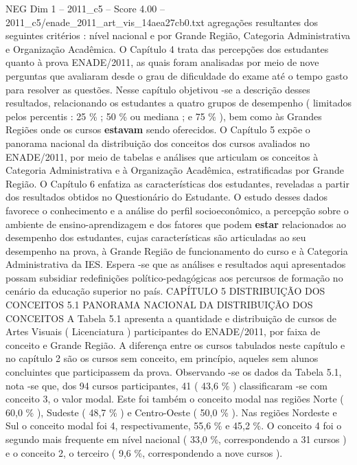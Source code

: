\begin{textsample}{NEG Dim 1 – 2011\_c5 – Score 4.00 – 2011\_c5/enade\_2011\_art\_vis\_14aea27cb0.txt}  \label{ex:f1_neg_312}
agregações resultantes dos seguintes critérios : nível nacional e por Grande Região, Categoria Administrativa e Organização Acadêmica.
O Capítulo 4 trata das percepções dos estudantes quanto à prova ENADE/2011, as quais foram analisadas por meio de nove perguntas que avaliaram desde o grau de dificuldade do exame até o tempo gasto para resolver as questões.
Nesse capítulo objetivou -se a descrição desses resultados, relacionando os estudantes a quatro grupos de desempenho ( limitados pelos percentis : 25 \% ; 50 \% ou mediana ; e 75 \% ), bem como às Grandes Regiões onde os cursos \textbf{estavam} sendo oferecidos.
O Capítulo 5 expõe o panorama nacional da distribuição dos conceitos dos cursos avaliados no ENADE/2011, por meio de tabelas e análises que articulam os conceitos à Categoria Administrativa e à Organização Acadêmica, estratificadas por Grande Região.
O Capítulo 6 enfatiza as características dos estudantes, reveladas a partir dos resultados obtidos no Questionário do Estudante.
O estudo desses dados favorece o conhecimento e a análise do perfil socioeconômico, a percepção sobre o ambiente de ensino-aprendizagem e dos fatores que podem \textbf{estar} relacionados ao desempenho dos estudantes, cujas características são articuladas ao seu desempenho na prova, à Grande Região de funcionamento do curso e à Categoria Administrativa da IES.
Espera -se que as análises e resultados aqui apresentados possam subsidiar redefinições político-pedagógicas aos percursos de formação no cenário da educação superior no país.
CAPÍTULO 5 DISTRIBUIÇÃO DOS CONCEITOS 5.1 PANORAMA NACIONAL DA DISTRIBUIÇÃO DOS CONCEITOS A Tabela 5.1 apresenta a quantidade e distribuição de cursos de Artes Visuais ( Licenciatura ) participantes do ENADE/2011, por faixa de conceito e Grande Região.
A diferença entre os cursos tabulados neste capítulo e no capítulo 2 são os cursos sem conceito, em princípio, aqueles sem alunos concluintes que participassem da prova.
Observando -se os dados da Tabela 5.1, nota -se que, dos 94 cursos participantes, 41 ( 43,6 \% ) classificaram -se com conceito 3, o valor modal.
Este foi também o conceito modal nas regiões Norte ( 60,0 \% ), Sudeste ( 48,7 \% ) e Centro-Oeste ( 50,0 \% ).
Nas regiões Nordeste e Sul o conceito modal foi 4, respectivamente, 55,6 \% e 45,2 \%.
O conceito 4 foi o segundo mais frequente em nível nacional ( 33,0 \%, correspondendo a 31 cursos ) e o conceito 2, o terceiro ( 9,6 \%, correspondendo a nove cursos ).

\end{textsample}
